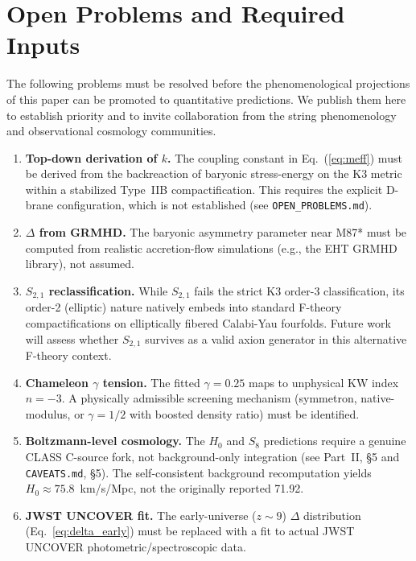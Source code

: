 \documentclass[12pt]{article}
\begin{document}
\section{Open Problems and Required Inputs}
\label{sec:open_problems}

The following problems must be resolved before the phenomenological projections of this paper can be promoted to quantitative predictions.
We publish them here to establish priority and to invite collaboration from the string phenomenology and observational cosmology communities.

\begin{enumerate}
\item \textbf{Top-down derivation of $k$.} The coupling constant in Eq.~(\ref{eq:meff}) must be derived from the backreaction of baryonic stress-energy on the K3 metric within a stabilized Type~IIB compactification.
This requires the explicit D-brane configuration, which is not established (see \texttt{OPEN\_PROBLEMS.md}).

\item \textbf{$\Delta$ from GRMHD.} The baryonic asymmetry parameter near M87* must be computed from realistic accretion-flow simulations (e.g., the EHT GRMHD library), not assumed.

\item \textbf{$S_{2,1}$ reclassification.} While $S_{2,1}$ fails the strict K3 order-3 classification, its order-2 (elliptic) nature natively embeds into standard F-theory compactifications on elliptically fibered Calabi-Yau fourfolds. Future work will assess whether $S_{2,1}$ survives as a valid axion generator in this alternative F-theory context.

\item \textbf{Chameleon $\gamma$ tension.} The fitted $\gamma = 0.25$ maps to unphysical KW index $n = -3$.
A physically admissible screening mechanism (symmetron, native-modulus, or $\gamma = 1/2$ with boosted density ratio) must be identified.

\item \textbf{Boltzmann-level cosmology.} The $H_0$ and $S_8$ predictions require a genuine CLASS C-source fork, not background-only integration (see Part~II, \S5 and \texttt{CAVEATS.md}, \S5).
The self-consistent background recomputation yields $H_0 \approx 75.8$~km/s/Mpc, not the originally reported 71.92.

\item \textbf{JWST UNCOVER fit.} The early-universe ($z \sim 9$) $\Delta$ distribution (Eq.~\ref{eq:delta_early}) must be replaced with a fit to actual JWST UNCOVER photometric/spectroscopic data.
\end{enumerate}
\end{document}
